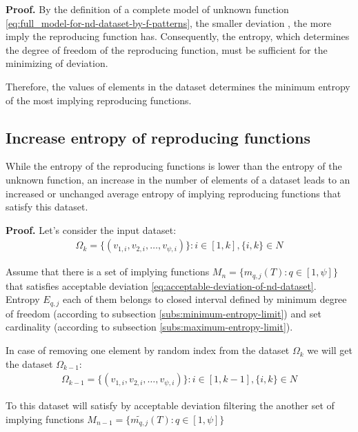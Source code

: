 \documentclass[a4paper, 11pt, oneside]{book}
\begin{document}
\textbf{Proof.}
By the definition of a complete model of unknown function \ref{eq:full_model-for-nd-dataset-by-f-patterns}, the smaller deviation , the more imply the reproducing function has. Consequently, the entropy, which determines the degree of freedom of the reproducing function, must be sufficient for the minimizing of deviation.

Therefore, the values of elements in the dataset determines the minimum entropy of the most implying reproducing functions.

\subsection{Increase entropy of reproducing functions}
While the entropy of the reproducing functions is lower than the entropy of the unknown function, an increase in the number of elements of a dataset leads to an increased or unchanged average entropy of implying reproducing functions that satisfy this dataset.

\textbf{Proof.}
Let's consider the input dataset:
\begin{align}\label{eq:increase-entropy-input-omegak}
  \Omega_k = \{(v_{1, i}, v_{2, i}, \ldots, v_{\psi, i})\}: i \in [1, k], \{i, k\} \in N
\end{align}

Assume that there is a set of implying functions $M_n = \{m_{q, j}(T): q \in [1, \psi]\}$ that satisfies acceptable deviation \ref{eq:acceptable-deviation-of-nd-dataset}. Entropy $E_{q, j}$ each of them belongs to closed interval defined by minimum degree of freedom (according to subsection \ref{subs:minimum-entropy-limit}) and set cardinality (according to subsection \ref{subs:maximum-entropy-limit}).

In case of removing one element by random index from the dataset $\Omega_k$ we will get the dataset $\Omega_{k - 1}$:
\begin{align}\label{eq:increase-entropy-input-omegakplus1}
  \Omega_{k - 1} = \{(v_{1, i}, v_{2, i}, \ldots, v_{\psi, i})\}: i \in [1, k - 1], \{i, k\} \in N
\end{align}

To this dataset will satisfy by acceptable deviation filtering the another set of implying functions $M_{n - 1} = \{\widetilde{m_{q, j}}(T): q \in [1, \psi]\}$
\end{document}
